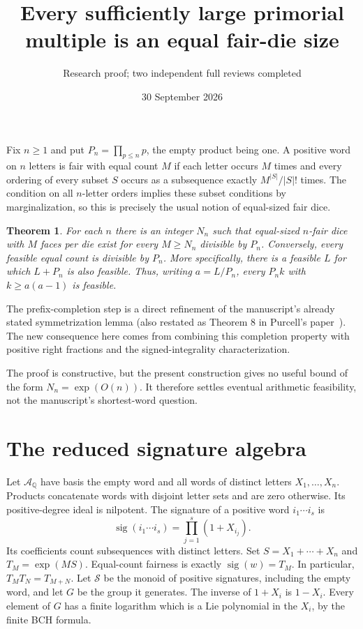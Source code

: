 \documentclass[11pt]{article}
\title{Every sufficiently large primorial multiple is an equal fair-die size}
\author{Research proof; two independent full reviews completed}
\date{30 September 2026}
\newtheorem{theorem}{Theorem}
\newcommand{\A}{\mathcal A}
\begin{document}
\maketitle

Fix $n\ge1$ and put $P_n=\prod_{p\le n}p$, the empty product being one.
A positive word on $n$ letters is fair with equal count $M$ if each letter
occurs $M$ times and every ordering of every subset $S$ occurs as a
subsequence exactly $M^{|S|}/|S|!$ times. The condition on all $n$-letter
orders implies these subset conditions by marginalization, so this is
precisely the usual notion of equal-sized fair dice.

\begin{theorem}\label{main}
For each $n$ there is an integer $N_n$ such that equal-sized $n$-fair dice
with $M$ faces per die exist for every $M\ge N_n$ divisible by $P_n$.
Conversely, every feasible equal count is divisible by $P_n$.
More specifically, there is a feasible $L$ for which $L+P_n$ is also
feasible. Thus, writing $a=L/P_n$, every $P_n k$ with
$k\ge a(a-1)$ is feasible.
\end{theorem}

The prefix-completion step is a direct refinement of the manuscript's
already stated symmetrization lemma (also restated as Theorem 8 in
Purcell's paper~\cite{purcell}). The new
consequence here comes from combining this completion property with
positive right fractions and the signed-integrality characterization.

The proof is constructive, but the present construction gives no useful
bound of the form $N_n=\exp(O(n))$. It therefore settles eventual
arithmetic feasibility, not the manuscript's shortest-word question.

\section*{The reduced signature algebra}
Let $\A_{\mathbb Q}$ have basis the empty word and all words of distinct
letters $X_1,\ldots,X_n$. Products concatenate words with disjoint letter
sets and are zero otherwise. Its positive-degree ideal is nilpotent.
The signature of a positive word $i_1\cdots i_s$ is
\[
 \operatorname{sig}(i_1\cdots i_s)=\prod_{j=1}^s(1+X_{i_j}).
\]
Its coefficients count subsequences with distinct letters. Set
$S=X_1+\cdots+X_n$ and $T_M=\exp(MS)$. Equal-count fairness is exactly
$\operatorname{sig}(w)=T_M$. In particular, $T_M T_N=T_{M+N}$.
Let $\mathcal S$ be the monoid of positive signatures, including the
empty word, and let $G$ be the group it generates. The inverse of
$1+X_i$ is $1-X_i$. Every element of $G$ has a finite logarithm which
is a Lie polynomial in the $X_i$, by the finite BCH formula.
\end{document}
